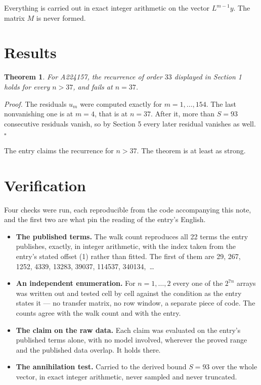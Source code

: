 \documentclass[11pt]{article}
\newtheorem{theorem}{Theorem}
\theoremstyle{definition}
\begin{document}
Everything is carried out in exact integer arithmetic on the vector $L^{m-1}y$. The matrix $M$ is never formed.

\section{Results}

\begin{theorem} For A224157, the recurrence of order $33$ displayed in Section 1 holds for every $n > 37$, and fails at $n = 37$.\end{theorem}

{\itshape Proof.} The residuals $u_m$ were computed exactly for $m = 1,\dots,154$. The last nonvanishing one is at $m = 4$, that is at $n = 37$. After it, more than $S = 93$ consecutive residuals vanish, so by Section 5 every later residual vanishes as well. $\square$

The entry claims the recurrence for $n > 37$. The theorem is at least as strong.

\section{Verification}

Four checks were run, each reproducible from the code accompanying this note, and the first two are what pin the reading of the entry's English.

\begin{itemize}

\item {\bfseries The published terms.} The walk count reproduces all 22 terms the entry publishes, exactly, in integer arithmetic, with the index taken from the entry's stated offset (1) rather than fitted. The first of them are 29, 267, 1252, 4339, 13283, 39037, 114537, 340134,~\dots

\item {\bfseries An independent enumeration.} For $n = 1,\dots,2$ every one of the $2^{7n}$ arrays was written out and tested cell by cell against the condition as the entry states it --- no transfer matrix, no row window, a separate piece of code. The counts agree with the walk count and with the entry.

\item {\bfseries The claim on the raw data.} Each claim was evaluated on the entry's published terms alone, with no model involved, wherever the proved range and the published data overlap. It holds there.

\item {\bfseries The annihilation test.} Carried to the derived bound $S = 93$ over the whole vector, in exact integer arithmetic, never sampled and never truncated.

\end{itemize}
\end{document}
